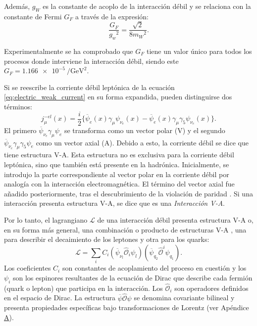 Además, $g_W$ es la constante de acoplo de la interacción débil y se relaciona con la constante de Fermi $G_F$ a través de la expresión:
\begin{equation}
\dfrac{G_{F}}{{g_{w}}^2}=\dfrac{\sqrt{2}}{8{m_{W}}^2}.\label{eq:fermi_coupling}
\end{equation}

Experimentalmente se ha comprobado que $G_F$ tiene un valor único para todos los procesos donde interviene la interacción débil, siendo este $G_{F}= \SI{1,166e-5}{\per\GeV\squared}$.

Si se reescribe la corriente débil leptónica de la ecuación \ref{eq:electric_weak_current} en su forma expandida, pueden distinguirse dos términos:
\begin{equation}
j_{\mu}^{-el}\left(x\right)= \dfrac{i}{2} \{ \overline{\psi}_{e}\left(x\right)\gamma _{\mu}\psi_{{\nu}_{e}}\left( x\right)- \overline{\psi}_{e}\left(x\right)\gamma _{\mu}\gamma_{5}\psi_{{\nu}_{e}}\left( x\right) \} .
\end{equation}
El primero $\overline{\psi}_{{\nu}_{e}}\gamma _{\mu}\psi_{e}$ se transforma como un vector polar (V) y el segundo $\overline{\psi}_{{\nu}_{e}}\gamma _{\mu}\gamma_{5}\psi_{e}$ como un vector axial (A). Debido a esto, la corriente débil se dice que tiene estructura V-A. Esta estructura no es exclusiva para la corriente débil leptónica, sino que también está presente en la hadrónica. Inicialmente, se introdujo la parte correspondiente al vector polar en la corriente débil por analogía con la interacción electromagnética. El término del vector axial fue añadido posteriormente, tras el descubrimiento de la violación de paridad \cite{Paschos}. Si una interacción presenta estructura V-A, se dice que es una \textit{Interacción V-A}.

Por lo tanto, el lagrangiano $\mathcal{L}$ de una interacción débil presenta estructura V-A o, en su forma más general, una combinación o producto de estructuras V-A \cite{Renton}, una para describir el decaimiento de los leptones y otra para los quarks:
\begin{equation}
\mathcal{L}= \sum _{i} C_{i}\left(\overline{\psi}_{\nu_l}\widehat{\mathcal{O}}_{i}\psi _{l}\right)\left( \overline{\psi }_{q_2}\widehat{\mathcal{O}}^{i}\psi _{q_1}\right) .
\end{equation}
Los coeficientes $C_i$ son constantes de acoplamiento del proceso en cuestión y los $\psi_i$ son los espinores resultantes de la ecuación de Dirac que describe cada fermión (quark o lepton) que participa en la interacción. Los $\widehat{\mathcal{O}}_{i}$ son operadores definidos en el espacio de Dirac. La estructura $\overline{\psi}\widehat{\mathcal{O}}\psi$ se denomina covariante bilineal y presenta propiedades específicas bajo transformaciones de Lorentz (ver Apéndice \hyperref[cap:A]{A}).

